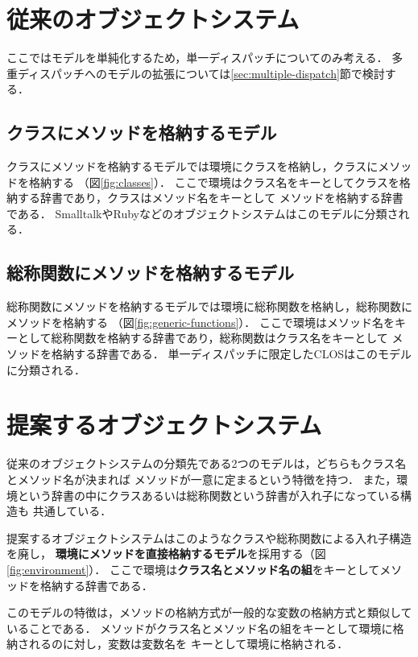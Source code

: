 \documentclass{ipsjprosym}
\begin{document}
\section{従来のオブジェクトシステム}

ここではモデルを単純化するため，単一ディスパッチについてのみ考える．
多重ディスパッチへのモデルの拡張については\ref{sec:multiple-dispatch}節で検討する．

\subsection{クラスにメソッドを格納するモデル}

クラスにメソッドを格納するモデルでは環境にクラスを格納し，クラスにメソッドを格納する
（図\ref{fig:classes}）．
ここで環境はクラス名をキーとしてクラスを格納する辞書であり，クラスはメソッド名をキーとして
メソッドを格納する辞書である．
SmalltalkやRubyなどのオブジェクトシステムはこのモデルに分類される．

\subsection{総称関数にメソッドを格納するモデル}
\label{sec:generic-finctions}

総称関数にメソッドを格納するモデルでは環境に総称関数を格納し，総称関数にメソッドを格納する
（図\ref{fig:generic-functions}）．
ここで環境はメソッド名をキーとして総称関数を格納する辞書であり，総称関数はクラス名をキーとして
メソッドを格納する辞書である．
単一ディスパッチに限定したCLOSはこのモデルに分類される．

\section{提案するオブジェクトシステム}

従来のオブジェクトシステムの分類先である2つのモデルは，どちらもクラス名とメソッド名が決まれば
メソッドが一意に定まるという特徴を持つ．
また，環境という辞書の中にクラスあるいは総称関数という辞書が入れ子になっている構造も
共通している．

提案するオブジェクトシステムはこのようなクラスや総称関数による入れ子構造を廃し，
\textbf{環境にメソッドを直接格納するモデル}を採用する（図\ref{fig:environment}）．
ここで環境は\textbf{クラス名とメソッド名の組}をキーとしてメソッドを格納する辞書である．

このモデルの特徴は，メソッドの格納方式が一般的な変数の格納方式と類似していることである．
メソッドがクラス名とメソッド名の組をキーとして環境に格納されるのに対し，変数は変数名を
キーとして環境に格納される．
\end{document}
